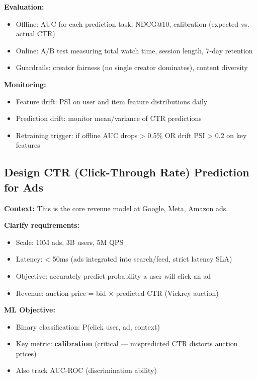 \documentclass[11pt]{article}
\providecommand{\tightlist}{\setlength{\itemsep}{1pt}\setlength{\parskip}{0pt}}
\begin{document}
\textbf{Evaluation:}

\begin{itemize}
\tightlist
\item
  Offline: AUC for each prediction task, NDCG@10, calibration (expected vs. actual CTR)
\item
  Online: A/B test measuring total watch time, session length, 7-day retention
\item
  Guardrails: creator fairness (no single creator dominates), content diversity
\end{itemize}

\textbf{Monitoring:}

\begin{itemize}
\tightlist
\item
  Feature drift: PSI on user and item feature distributions daily
\item
  Prediction drift: monitor mean/variance of CTR predictions
\item
  Retraining trigger: if offline AUC drops \textgreater{} 0.5\% OR drift PSI \textgreater{} 0.2 on key features
\end{itemize}

\subsection{Design CTR (Click-Through Rate) Prediction for Ads}\label{design-ctr-click-through-rate-prediction-for-ads}

\textbf{Context:} This is the core revenue model at Google, Meta, Amazon ads.

\textbf{Clarify requirements:}

\begin{itemize}
\tightlist
\item
  Scale: 10M ads, 3B users, 5M QPS
\item
  Latency: \textless{} 50ms (ads integrated into search/feed, strict latency SLA)
\item
  Objective: accurately predict probability a user will click an ad
\item
  Revenue: auction price = bid \(\times\) predicted CTR (Vickrey auction)
\end{itemize}

\textbf{ML Objective:}

\begin{itemize}
\tightlist
\item
  Binary classification: P(click \textbar{} user, ad, context)
\item
  Key metric: \textbf{calibration} (critical --- mispredicted CTR distorts auction prices)
\item
  Also track AUC-ROC (discrimination ability)
\end{itemize}
\end{document}
